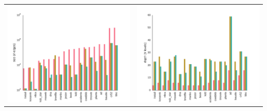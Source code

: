 \documentclass[final]{beamer}
\begin{document}
\begin{frame}{}
\begin{textblock}{25.7}
    \begin{table}[ht]
      \setlength{\tabcolsep}{30pt}  
      \centering
      \begin{tabular}{c c}
        \includegraphics[width=0.4\linewidth]{figures/edges-comp.pdf}&\includegraphics[width=0.4\linewidth]{figures/levels-comp.pdf}
      \end{tabular}
    \end{table}




\end{textblock}
\end{frame}
\end{document}

